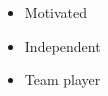 %
%
%

\twocolumnsection
{
\begin{skills}
\end{skills}}
{
\vspace{1em}
\begin{itemize}
	\item Motivated
	\item Independent                    
    \item Team player
\end{itemize}
}
